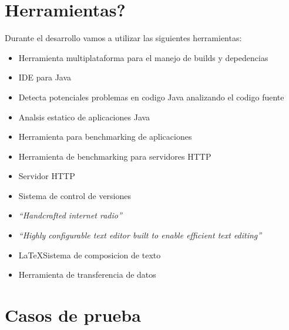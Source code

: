 \documentclass[11pt,a4paper,titlepage]{article}
\begin{document}
\section{Herramientas?}
    Durante el desarrollo vamos a utilizar las siguientes herramientas:
    \begin{itemize}
        \item {} Herramienta multiplataforma para el manejo de builds y depedencias
        \item {} IDE para Java
        \item {} Detecta potenciales problemas en codigo Java analizando el codigo fuente
        \item {} Analsis estatico de aplicaciones Java
        \item {} Herramienta para benchmarking de aplicaciones
        \item {} Herramienta de benchmarking para servidores HTTP
        \item {} Servidor HTTP
        \item {} Sistema de control de versiones
        \item {} \emph{``Handcrafted internet radio''}
        \item {} \emph{``Highly configurable text editor built to enable efficient text editing''}
        \item \LaTeX  Sistema de composicion de texto
        \item {} Herramienta de transferencia de datos
    \end{itemize}

\section{Casos de prueba}
\end{document}
